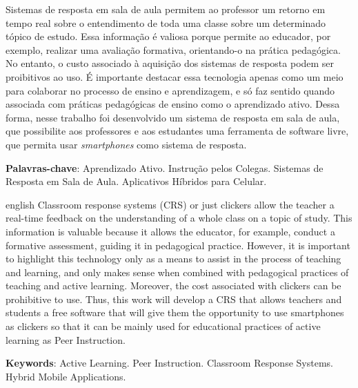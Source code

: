 \setlength{\absparsep}{18pt} %
\begin{resumo}
  Sistemas de resposta em sala de aula permitem ao professor um retorno
  em tempo real sobre o entendimento de toda uma classe sobre um determinado
  tópico de estudo. Essa informação é valiosa porque permite ao educador, por exemplo,
  realizar uma avaliação formativa, orientando-o na prática pedagógica.
  No entanto, o custo associado à aquisição dos sistemas de resposta podem ser proibitivos ao uso.
  É importante destacar essa tecnologia apenas como um meio para colaborar no processo
  de ensino e aprendizagem, e só faz sentido quando associada com práticas
  pedagógicas de ensino como o aprendizado ativo.
  Dessa forma, nesse trabalho foi desenvolvido um sistema de resposta em sala de aula,
  que possibilite aos professores e aos estudantes uma ferramenta de software livre, que permita
  usar \textit{smartphones} como sistema de resposta.

 \textbf{Palavras-chave}:  Aprendizado Ativo. Instrução pelos Colegas. Sistemas de Resposta em Sala de Aula. Aplicativos Híbridos para Celular.
\end{resumo}

\begin{resumo}[Abstract]
 \begin{otherlanguage*}{english}
   Classroom response systems (CRS) or just clickers allow the teacher a real-time feedback on the understanding of a whole class on a topic of study. This information is valuable because it allows the educator, for example, conduct a formative assessment, guiding it in pedagogical practice.
   However, it is important to highlight this technology only as a means to assist in the process of teaching and learning, and only makes sense when combined with pedagogical practices of teaching and active learning. Moreover, the cost associated with clickers can be prohibitive to use. Thus, this work will develop a CRS that allows teachers and students a free software that will give them the opportunity to use smartphones as clickers so that it can be mainly used for educational practices of active learning as Peer Instruction.

   \noindent
   \textbf{Keywords}: Active Learning. Peer Instruction. Classroom Response Systems. Hybrid Mobile Applications.
 \end{otherlanguage*}
\end{resumo}
